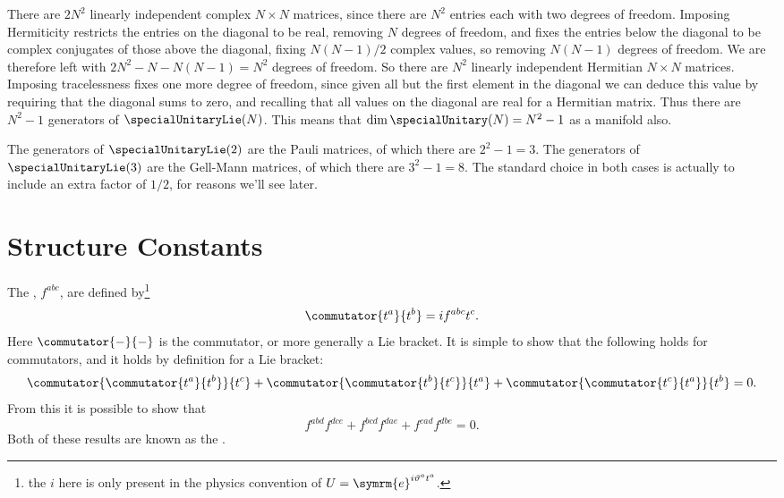 \documentclass[fleqn]{NotesClass}
\newcommand{\e}{\symrm{e}}
\begin{document}
    There are \(2N^2\) linearly independent complex \(N \times N\) matrices, since there are \(N^2\) entries each with two degrees of freedom.
    Imposing Hermiticity restricts the entries on the diagonal to be real, removing \(N\) degrees of freedom, and fixes the entries below the diagonal to be complex conjugates of those above the diagonal, fixing \(N(N - 1)/2\) complex values, so removing \(N(N - 1)\) degrees of freedom.
    We are therefore left with \(2N^2 - N - N(N - 1) = N^2\) degrees of freedom.
    So there are \(N^2\) linearly independent Hermitian \(N \times N\) matrices.
    Imposing tracelessness fixes one more degree of freedom, since given all but the first element in the diagonal we can deduce this value by requiring that the diagonal sums to zero, and recalling that all values on the diagonal are real for a Hermitian matrix.
    Thus there are \(N^2 - 1\) generators of \(\specialUnitaryLie(N)\).
    This means that \(\dim \specialUnitary(N) = N^2 - 1\) as a manifold also.
    
    The generators of \(\specialUnitaryLie(2)\) are the Pauli matrices, of which there are \(2^2 - 1 = 3\).
    The generators of \(\specialUnitaryLie(3)\) are the Gell-Mann matrices, of which there are \(3^2 - 1 = 8\).
    The standard choice in both cases is actually to include an extra factor of \(1/2\), for reasons we'll see later.
    
    \section{Structure Constants}
    The , \(f^{abc}\), are defined by\footnote{the \(i\) here is only present in the physics convention of \(U = \e^{i\vartheta^a t^a}\).}
    \begin{equation}
        \commutator{t^a}{t^b} = if^{abc}t^c.
    \end{equation}
    Here \(\commutator{-}{-}\) is the commutator, or more generally a Lie bracket.
    It is simple to show that the following holds for commutators, and it holds by definition for a Lie bracket:
    \begin{equation}
        \commutator{\commutator{t^a}{t^b}}{t^c} + \commutator{\commutator{t^b}{t^c}}{t^a} + \commutator{\commutator{t^c}{t^a}}{t^b} = 0.
    \end{equation}
    From this it is possible to show that
    \begin{equation}
        f^{abd}f^{dce} + f^{bcd}f^{dae} + f^{cad}f^{dbe} = 0.
    \end{equation}
    Both of these results are known as the .
    
\end{document}
